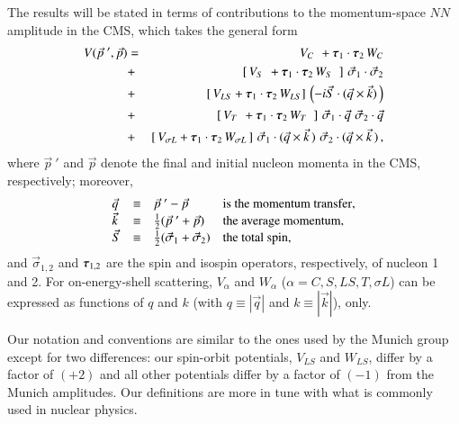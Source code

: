 \documentclass[sort&compress,preprint,3p]{elsarticle}
\newcommand{\bbox}[1]{\mbox{\boldmath $#1$}}
\begin{document}
The results will be stated in terms of contributions to the 
momentum-space $NN$ amplitude
in the CMS, 
which takes the general form
\begin{eqnarray} 
V({\vec p}~', \vec p) &  = &
 \:\, V_C \:\, + 
\bbox{\tau}_1 \cdot \bbox{\tau}_2 
\, W_C 
\nonumber \\ &+&  
\left[ \, V_S \:\, + \bbox{\tau}_1 \cdot \bbox{\tau}_2 \, W_S 
\,\:\, \right] \,
\vec\sigma_1 \cdot \vec \sigma_2
\nonumber \\ &+& 
\left[ \, V_{LS} + \bbox{\tau}_1 \cdot \bbox{\tau}_2 \, W_{LS}    
\right] \,
\left(-i \vec S \cdot (\vec q \times \vec k) \,\right)
\nonumber \\ &+& 
\left[ \, V_T \:\,     + \bbox{\tau}_1 \cdot \bbox{\tau}_2 \, W_T 
\,\:\, \right] \,
\vec \sigma_1 \cdot \vec q \,\, \vec \sigma_2 \cdot \vec q  
\nonumber \\ &+& 
\left[ \, V_{\sigma L} + \bbox{\tau}_1 \cdot \bbox{\tau}_2 \, 
      W_{\sigma L} \, \right] \,
\vec\sigma_1\cdot(\vec q\times \vec k\,) \,\,
\vec \sigma_2 \cdot(\vec q\times \vec k\,)
\, ,
\label{eq_nnamp}
\end{eqnarray}
where ${\vec p}~'$ and $\vec p$ denote the 
final and initial nucleon momenta 
in the CMS, 
respectively; moreover,
\begin{equation}
\begin{array}{llll}
\vec q &\equiv& {\vec p}~' - \vec p &  \mbox{\rm is the 
momentum transfer},\\
\vec k &\equiv& \frac12 ({\vec p}~' + \vec p) & \mbox{\rm the 
average momentum},\\
\vec S &\equiv& \frac12 (\vec\sigma_1+\vec\sigma_2) & 
\mbox{\rm the total spin},
\end{array}
\label{eq_defqk}
\end{equation}
and $\vec \sigma_{1,2}$ and $\bbox{\tau}_{1,2}$ are 
the spin and isospin 
operators, respectively, of nucleon 1 and 2.
For on-energy-shell scattering, $V_\alpha$ and $W_\alpha$ 
($\alpha=C,S,LS,T,\sigma L$) can be expressed as functions of 
$q$ and $k$ (with
$q\equiv |\vec q|$ and $k\equiv |\vec k|$), only.

Our notation and conventions are similar to the ones used by the Munich 
group~\cite{KBW97,Kai01a,Kai01b} except for two
differences: 
our spin-orbit potentials,
$V_{LS}$ and $W_{LS}$, differ by a factor of $(+2)$
and all other potentials 
differ by a factor of $(-1)$ 
from the Munich amplitudes.
Our definitions are more
in tune with what is commonly used in nuclear physics.
\end{document}
